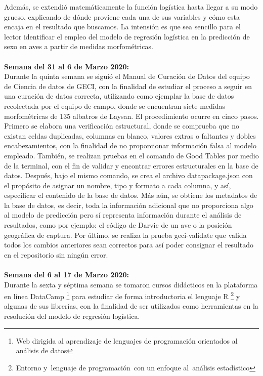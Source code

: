 \documentclass{article}
\begin{document}
    Además, se extendió matemáticamente la función logística hasta llegar a su modo grueso, explicando de dónde proviene cada una de sus variables y cómo esta encaja en el resultado que buscamos. La intensión es que sea sencillo para el lector identificar el empleo del modelo de regresión logística en la predicción de sexo en aves a partir de medidas morfométricas. 
    \\ \\
    \textbf{Semana del 31 al 6 de Marzo 2020:} \\
    Durante la quinta semana se siguió el Manual de Curación de Datos del equipo de Ciencia de datos de GECI, con la finalidad de estudiar el proceso a seguir en una curación de datos correcta, utilizando como ejemplar la base de datos recolectada por el equipo de campo, donde se encuentran siete medidas morfométricas de 135 albatros de Laysan.
    El procedimiento ocurre en cinco pasos. Primero se elabora una verificación estructural, donde se comprueba que no existan celdas duplicadas, columnas en blanco, valores extras o faltantes y dobles encabezamientos, con la finalidad de no proporcionar información falsa al modelo empleado. También, se realizan pruebas en el comando de Good Tables por medio de la terminal, con el fin de validar y encontrar errores estructurales en la base de datos.
    Después, bajo el mismo comando, se crea el archivo datapackage.json con el propósito de asignar un nombre, tipo y formato a cada columna, y así, especificar el contenido de la base de datos. Más aún, se obtiene los metadatos de la base de datos, es decir, toda la información adicional que no proporciona algo al modelo de predicción pero sí representa información durante el análisis de resultados, como por ejemplo: el código de Darvic de un ave o la posición geográfica de captura.
    Por último, se realiza la prueba geci-validate que valida todos los cambios anteriores sean correctos para así poder consignar el resultado en el repositorio sin ningún error. 
    \\ \\
    \textbf{Semana del 6 al 17 de Marzo 2020:} \\
    Durante la sexta y séptima semana se tomaron cursos didácticos en la plataforma en línea DataCamp \footnote{Web dirigida al aprendizaje de lenguajes de programación orientados al análisis de datos} para estudiar de forma introductoria el lenguaje R \footnote{Entorno y lenguaje de programación con un enfoque al análisis estadístico} y algunas de sus librerías, con la finalidad de ser utilizados como herramientas en la resolución del modelo de regresión logística.
\end{document}
